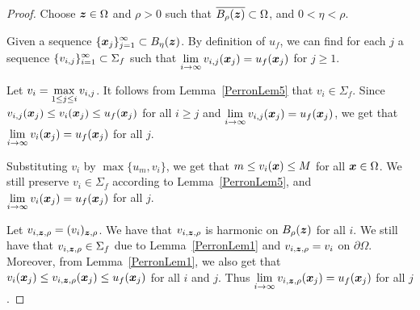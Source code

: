 \begin{proof}
Choose ${\bm{z}} \in \Omega$ and $\rho>0$ such that
$\displaystyle \overline{B_{\rho}({\bm{z}})} \subset \Omega$,
and $0 < \eta < \rho$.

 Given a sequence
$\displaystyle \{{\bm{x}}_j\}_{j=1}^\infty \subset B_\eta({\bm{z}})$.
By definition of $u_f$, we can find for each $j$ a sequence
$\displaystyle \{v_{i,j}\}_{i=1}^\infty \subset \Sigma_f$ such that
$\displaystyle \lim_{i \to \infty} v_{i,j}({\bm{x}}_j) = u_f({\bm{x}}_j)$
for $j \geq 1$.

Let $\displaystyle v_i = \max_{1\leq j \leq i} v_{i,j}$.  It follows
from Lemma~\ref{PerronLem5} that $v_i \in \Sigma_f$.  Since
$\displaystyle v_{i,j}({\bm{x}}_j) \leq v_i({\bm{x}}_j) \leq u_f({\bm{x}}_j)$
for all $i \geq j$ and
$\displaystyle \lim_{i \to \infty} v_{i,j}({\bm{x}}_j) = u_f({\bm{x}}_j)$,
we get that
$\displaystyle \lim_{i \to \infty} v_i({\bm{x}}_j) = u_f({\bm{x}}_j)$
for all $j$.

Substituting $v_i$ by $\max \{u_m,v_i\}$, we get that
$m \leq v_i({\bm{x}}) \leq M$ for all ${\bm{x}} \in \Omega$.  We still
preserve $v_i \in \Sigma_f$ according to Lemma~\ref{PerronLem5},
and
$\displaystyle \lim_{i \to \infty} v_i({\bm{x}}_j) = u_f({\bm{x}}_j)$
for all $j$.

Let $v_{i,{\bm{z}},\rho} = (v_i)_{{\bm{z}},\rho}$.  We have that
$v_{i,{\bm{z}},\rho}$ is harmonic on $B_\rho({\bm{z}})$ for all $i$.
We still have that $v_{i,{\bm{z}},\rho} \in \Sigma_f$
due to Lemma~\ref{PerronLem1} and
$v_{i,{\bm{z}},\rho} = v_i$ on $\partial \Omega$.  Moreover,
from Lemma~\ref{PerronLem1}, we also get that
$\displaystyle v_i({\bm{x}}_j) \leq v_{i,{\bm{z}},\rho}({\bm{x}}_j)
\leq u_f({\bm{x}}_j)$ for all $i$ and $j$.  Thus
$\displaystyle \lim_{i \to \infty} v_{i,{\bm{z}},\rho}({\bm{x}}_j) = u_f({\bm{x}}_j)$
for all $j$.


\end{proof}
